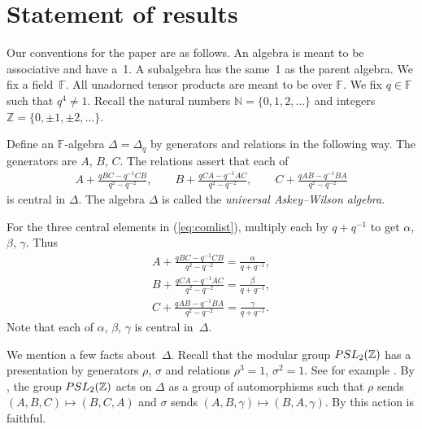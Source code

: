 \documentclass[11pt]{article}
\numberwithin{equation}{section}
\begin{document}
\section{Statement of results}\label{section2}

Our conventions for the paper are as follows.
An algebra is meant to be associative and have a~1.
A subalgebra has the same~1 as the parent algebra.
We f\/ix a f\/ield~$\mathbb F$. All unadorned tensor products
are meant to be over $\mathbb F$. We f\/ix $q \in \mathbb F$ such that
$q^4\not=1$. Recall the natural numbers
$\mathbb N = \lbrace 0,1,2,\ldots \rbrace$ and
integers $\mathbb Z=\lbrace 0, \pm 1, \pm 2,\ldots \rbrace$.

\begin{Definition}
\label{def:uaw}
Def\/ine an $\mathbb F$-algebra
$\Delta=\Delta_q$
by generators and relations in the following way.
The generators are $A$, $B$, $C$.
The relations assert that each of
\begin{gather}
 A+ \frac{qBC-q^{-1}CB}{q^2-q^{-2}},
\qquad B+
\frac{qCA-q^{-1}AC}{q^2-q^{-2}},
\qquad
C+
\frac{qAB-q^{-1}BA}{q^2-q^{-2}}
\label{eq:comlist}
\end{gather}
is central in $\Delta$.
The algebra
$\Delta$ is called the {\it universal Askey--Wilson algebra}.
\end{Definition}

\begin{Definition}
\label{def:abc}
For the
three central elements in
(\ref{eq:comlist}), multiply each by $q+q^{-1}$ to get
$\alpha$, $\beta$, $\gamma$. Thus
\begin{gather}
A+ \frac{qBC-q^{-1}CB}{q^2-q^{-2}}
 =
\frac{\alpha}{q+q^{-1}},
\label{eq:u1}
\\
B+
\frac{qCA-q^{-1}AC}{q^2-q^{-2}}
 =
\frac{\beta}{q+q^{-1}},
\label{eq:u2}
\\
C+
\frac{qAB-q^{-1}BA}{q^2-q^{-2}}
 =
\frac{\gamma}{q+q^{-1}}.
\label{eq:u3}
\end{gather}
Note that each of $\alpha$, $\beta$, $\gamma$ is central in~$\Delta$.
\end{Definition}

We mention a few facts about~$\Delta$.
Recall that the modular group
${\rm  {PSL}}_2(\mathbb Z)$ has a presentation
by generators $\rho$, $\sigma$ and relations
$\rho^3=1$, $\sigma^2=1$. See for example
\cite{alpern}.
By \cite[Theorem~3.1]{uaw},
the group
${\rm  {PSL}}_2(\mathbb Z)$ acts on
$\Delta$ as a group of automorphisms
such that
$\rho$
 sends
$(A,B,C)\mapsto (B,C,A)$
and  $\sigma $
sends
$(A,B,\gamma)\mapsto (B,A,\gamma)$.
By
\cite[Theorem~3.13]{uaw}
this action is faithful.
\end{document}
